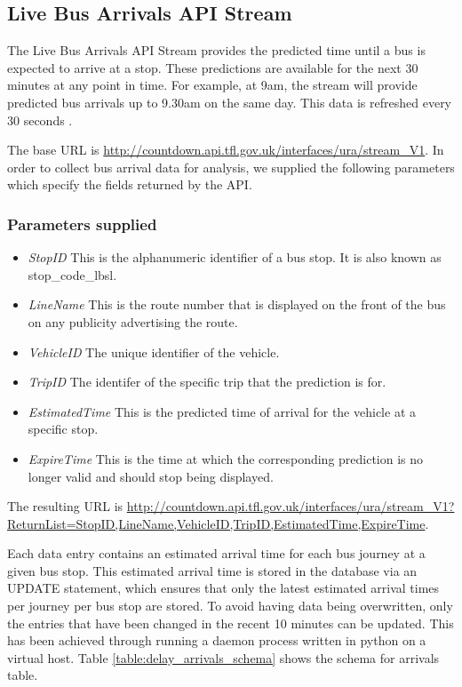 \subsection{Live Bus Arrivals API Stream}
\par The Live Bus Arrivals API Stream provides the predicted time until a bus is expected to arrive at a stop. These predictions are available for the next 30 minutes at any point in time. For example, at 9am, the stream will provide predicted bus arrivals up to 9.30am on the same day. This data is refreshed every 30 seconds \cite{live_bus_api_documentation}.

\par The base URL is \url{http://countdown.api.tfl.gov.uk/interfaces/ura/stream_V1}. In order to collect bus arrival data for analysis, we supplied the following parameters which specify the fields returned by the API.

\subsubsection{Parameters supplied}
\begin{itemize}
	\item \textit{StopID} This is the alphanumeric identifier of a bus stop. It is also known as stop\_code\_lbsl.
 	\item \textit{LineName} This is the route number that is displayed on the front of the bus on any publicity advertising the route.
  \item \textit{VehicleID} The unique identifier of the vehicle.
  \item \textit{TripID} The identifer of the specific trip that the prediction is for.
  \item \textit{EstimatedTime} This is the predicted time of arrival for the vehicle at a specific stop.
  \item \textit{ExpireTime} This is the time at which the corresponding prediction is no longer valid and should stop being displayed.
\end{itemize}

\par The resulting URL is \sloppy \url{http://countdown.api.tfl.gov.uk/interfaces/ura/stream_V1?ReturnList=StopID,LineName,VehicleID,TripID,EstimatedTime,ExpireTime}.

\par Each data entry contains an estimated arrival time for each bus journey at a given bus stop. This estimated arrival time is stored in the database via an UPDATE statement, which ensures that only the latest estimated arrival times per journey per bus stop are stored. To avoid having data being overwritten, only the entries that have been changed in the recent 10 minutes can be updated. This has been achieved through running a daemon process written in python on a virtual host. Table \ref{table:delay_arrivals_schema} shows the schema for arrivals table.

